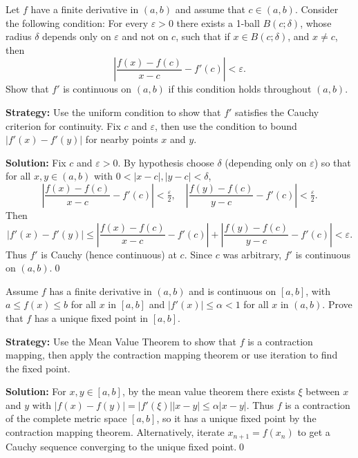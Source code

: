 \begin{problembox}
Let \( f \) have a finite derivative in \( (a, b) \) and assume that \( c \in (a, b) \). Consider the following condition: For every \( \varepsilon > 0 \) there exists a 1-ball \( B(c; \delta) \), whose radius \( \delta \) depends only on \( \varepsilon \) and not on \( c \), such that if \( x \in B(c; \delta) \), and \( x \neq c \), then
\[ \left| \frac{f(x) - f(c)}{x - c} - f'(c) \right| < \varepsilon. \]
Show that \( f' \) is continuous on \( (a, b) \) if this condition holds throughout \( (a, b) \).
\end{problembox}

\noindent\textbf{Strategy:} Use the uniform condition to show that \( f' \) satisfies the Cauchy criterion for continuity. Fix \( c \) and \( \varepsilon \), then use the condition to bound \( |f'(x) - f'(y)| \) for nearby points \( x \) and \( y \).

\bigskip\noindent\textbf{Solution:}
Fix $c$ and $\varepsilon>0$. By hypothesis choose $\delta$ (depending only on $\varepsilon$) so that for all $x,y\in(a,b)$ with $0<|x-c|,|y-c|<\delta$,
\[\left|\frac{f(x)-f(c)}{x-c}-f'(c)\right|<\tfrac\varepsilon2,\quad \left|\frac{f(y)-f(c)}{y-c}-f'(c)\right|<\tfrac\varepsilon2.\]
Then
\[|f'(x)-f'(y)|\le \left|\frac{f(x)-f(c)}{x-c}-f'(c)\right|+\left|\frac{f(y)-f(c)}{y-c}-f'(c)\right|<\varepsilon.\]
Thus $f'$ is Cauchy (hence continuous) at $c$. Since $c$ was arbitrary, $f'$ is continuous on $(a,b)$.\qed


\begin{problembox}
Assume \( f \) has a finite derivative in \( (a, b) \) and is continuous on \( [a, b] \), with \( a \leq f(x) \leq b \) for all \( x \) in \( [a, b] \) and \( |f'(x)| \leq \alpha < 1 \) for all \( x \) in \( (a, b) \). Prove that \( f \) has a unique fixed point in \( [a, b] \).
\end{problembox}

\noindent\textbf{Strategy:} Use the Mean Value Theorem to show that \( f \) is a contraction mapping, then apply the contraction mapping theorem or use iteration to find the fixed point.

\bigskip\noindent\textbf{Solution:}
For $x,y\in[a,b]$, by the mean value theorem there exists $\xi$ between $x$ and $y$ with $|f(x)-f(y)|=|f'(\xi)||x-y|\le \alpha|x-y|$. Thus $f$ is a contraction of the complete metric space $[a,b]$, so it has a unique fixed point by the contraction mapping theorem. Alternatively, iterate $x_{n+1}=f(x_n)$ to get a Cauchy sequence converging to the unique fixed point.\qed


